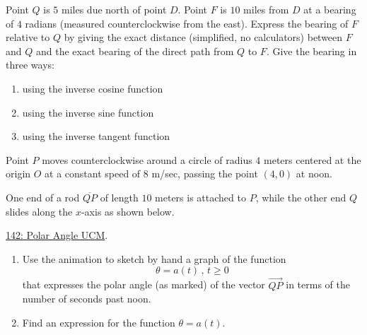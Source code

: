 \documentclass{ximera}
\begin{document}
\begin{question} \label{QEggdR34rRER}
Point $Q$ is $5$ miles due north of point $D$. Point $F$ is $10$ miles from $D$ at a bearing of $4$ radians (measured counterclockwise from the east). Express the bearing of $F$ relative to $Q$ by giving the exact distance (simplified, no calculators) between $F$ and $Q$ and the exact bearing of the direct path from $Q$ to $F$. Give the bearing in three ways:

\begin{enumerate}
\item using the inverse cosine function

\item using the inverse sine function

\item using the inverse tangent function

\end{enumerate}
\end{question}

\begin{question} \label{QOgggERE34rd}

Point $P$ moves counterclockwise around a circle of radius $4$ meters centered at the origin $O$ at a constant speed of $8$ m/sec, passing the point $(4,0)$ at noon.


One end of a rod $\overline{QP}$ of length $10$ meters is attached to $P$, while the other end $Q$ slides along the $x$-axis as shown below. 
 
\href{https://www.desmos.com/calculator/dra9jtsynq}{142: Polar Angle UCM}.

 
\begin{onlineOnly}
    \begin{center}
\end{center}
\end{onlineOnly}


\begin{enumerate}

\item Use the animation to sketch by hand a graph of the function
\[
    \theta = a(t) \, , \, t\geq 0
\]
that expresses the polar angle (as marked) of the vector $\overrightarrow{QP}$ in terms of the number of seconds past noon.

\item Find an expression for the function $\theta = a(t)$.

\end{enumerate}
\end{question}
\end{document}
